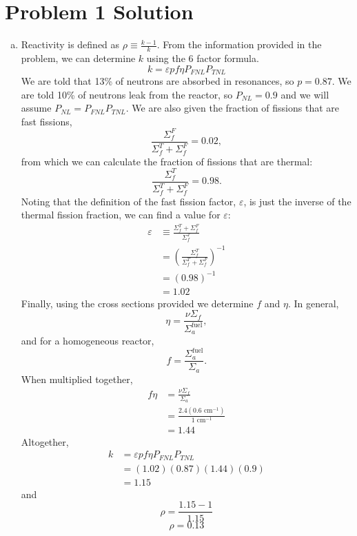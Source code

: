\documentclass{report}
\begin{document}
\section*{Problem 1 Solution}

\begin{enumerate}[a)]

\item Reactivity is defined as $\rho \equiv \frac{k - 1}{k}$. From the information provided in the problem, we can determine $k$ using the 6 factor formula. 
$$ k = \varepsilon p f \eta P_{\textit{FNL}} P_{\textit{TNL}} $$
We are told that 13\% of neutrons are absorbed in resonances, so $p = 0.87$. We are told 10\% of neutrons leak from the reactor, so $P_{\textit{NL}} = 0.9$ and we will assume $P_{\textit{NL}} = P_{\textit{FNL}} P_{\textit{TNL}}$. We are also given the fraction of fissions that are fast fissions,
$$ \frac{\Sigma_f^F}{\Sigma_f^T + \Sigma_f^F} = 0.02 ,$$
from which we can calculate the fraction of fissions that are thermal:
$$ \frac{\Sigma_f^T}{\Sigma_f^T + \Sigma_f^F} = 0.98 .$$
Noting that the definition of the fast fission factor, $\varepsilon$, is just the inverse of the thermal fission fraction, we can find a value for $\varepsilon$:
\begin{align*}
\varepsilon	&\equiv \frac{\Sigma_f^T + \Sigma_f^F}{\Sigma_f^T} \\
			&= \left(\frac{\Sigma_f^T}{\Sigma_f^T + \Sigma_f^F}\right)^{-1} \\
			&= \left(0.98\right)^{-1} \\
			&= 1.02 
\end{align*}
Finally, using the cross sections provided we determine $f$ and $\eta$. In general,
$$ \eta = \frac{\nu\Sigma_f}{\Sigma_a^{\text{fuel}}} ,$$
and for a homogeneous reactor, 
$$ f = \frac{\Sigma_a^{\text{fuel}}}{\Sigma_a} .$$
When multiplied together,
\begin{align*}
f \eta	&= \frac{\nu\Sigma_f}{\Sigma_a} \\
		&= \frac{2.4\left(0.6\text{ cm}^{-1}\right)}{1\text{ cm}^{-1}} \\
		&= 1.44
\end{align*}
Altogether,
\begin{align*}
k	&= \varepsilon p f \eta P_{\textit{FNL}} P_{\textit{TNL}} \\
	&= \left(1.02\right)\left(0.87\right)\left(1.44\right)\left(0.9\right) \\
	&= 1.15
\end{align*}
and
$$ \rho = \frac{1.15-1}{1.15} $$
$$\boxed{ \rho = 0.13 }$$


\end{enumerate}
\end{document}
